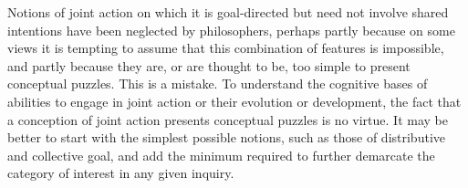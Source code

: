 \documentclass[12pt,a4paper]{extarticle}
\begin{document}
Notions of joint action on which it is goal-directed but need not involve shared intentions have been neglected by philosophers, perhaps 
 partly because on some views it is tempting to assume that this combination of features is impossible, and 
partly because they are, or are thought to be, too simple to present conceptual puzzles.
This is a mistake.  
To understand the cognitive bases of abilities to engage in joint action or their evolution or development, the fact that a conception of joint action presents conceptual puzzles is no virtue.
It may be better to start with the simplest possible notions, such as those of distributive and collective goal, and add the minimum required to further demarcate the category of interest in any given inquiry.



\begin{comment}
This problem is that the definition applies to too broad a range of cases.  
To illustrate, imagine a section of stone wall which is very stable but has one weakness: if two small pieces are removed, the wall will collapse.
Now suppose that George removes one of these pieces and Philip removes the other, which causes the wall to collapse. 
George's and Philip's removals ground the event of the wall's collapse.
This is sufficient, on the revised simple definition, for George and Phillip to be agents of the wall's collapse.
And on the revised simple definition this in turn means that an event comprising their removal of the pieces and the wall's collapse is a joint action.
This is so even if  George's and Philips' actions were uncoordinated (other than by virtue of both involving the wall) and even if there was no contact at all between George and Phillip.
They may have no idea of each other's role; their actions may even have occurred hundreds of years apart.
Further, neither need have intended to destroy the wall.
Perhaps George needed a piece of stone and Philip's intention was to hide a ring in the wall.
Despite all this their destroying the wall would count as a joint action on the revised simple definition.
\end{comment}
\end{document}
